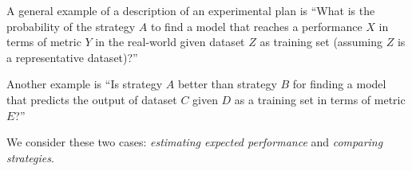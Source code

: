 A general example of a description of an experimental plan is ``What is the probability of
the strategy $A$ to find a model that reaches a performance $X$ in terms of metric $Y$ in
the real-world given dataset $Z$ as training set (assuming $Z$ is a representative
dataset)?''

Another example is ``Is strategy $A$ better than strategy $B$ for finding a model that
predicts the output of dataset $C$ given $D$ as a training set in terms of metric $E$?''

We consider these two cases: \emph{estimating expected performance} and \emph{comparing
strategies}.

